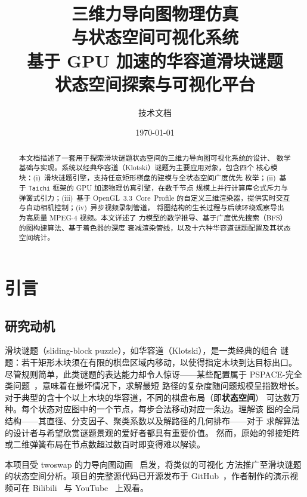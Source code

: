 \documentclass[11pt,a4paper]{report}
\title{\vspace{-2cm}
       \textbf{三维力导向图物理仿真 \\[0.3em]
              与状态空间可视化系统} \\[0.6em]
       \large 基于 GPU 加速的华容道滑块谜题 \\[0.2em]
       状态空间探索与可视化平台}
\author{技术文档}
\date{\today}
\begin{document}
\maketitle
\begin{abstract}
本文档描述了一套用于探索滑块谜题状态空间的三维力导向图可视化系统的设计、
数学基础与实现。系统以经典华容道（Klotski）谜题为主要应用对象，包含四个
核心模块：(i)~滑块谜题引擎，支持任意矩形棋盘的建模与全状态空间广度优先
枚举；(ii)~基于 \texttt{Taichi} 框架的 GPU 加速物理仿真引擎，在数千节点
规模上并行计算库仑式斥力与弹簧式引力；(iii)~基于 OpenGL~3.3~Core~Profile
的自定义三维渲染器，提供实时交互与自动相机控制；(iv)~异步视频录制管道，
将图结构的生长过程与后续环绕观察导出为高质量 MPEG-4 视频。本文详述了
力模型的数学推导、基于广度优先搜索（BFS）的图构建算法、基于着色器的深度
衰减渲染管线，以及十六种华容道谜题配置及其状态空间统计。
\end{abstract}
\tableofcontents
\listoffigures
\listoftables
\chapter{引言}
\label{ch:introduction}
\section{研究动机}
\label{sec:motivation}
滑块谜题（sliding-block puzzle），如华容道（Klotski），是一类经典的组合
谜题：若干矩形木块须在有限的棋盘区域内移动，以使得指定木块到达目标出口。
尽管规则简单，此类谜题的表达能力却令人惊讶——某些配置属于
PSPACE-完全类问题~\cite{hearn2006slides}，意味着在最坏情况下，求解最短
路径的复杂度随问题规模呈指数增长。
对于典型的含十个以上木块的华容道，不同的棋盘布局（即\textbf{状态空间}）
可达数万种。每个状态对应图中的一个节点，每步合法移动对应一条边。理解该
图的全局结构——其直径、分支因子、聚类系数以及解路径的几何排布——对于
求解算法的设计者与希望欣赏谜题景观的爱好者都具有重要价值。
然而，原始的邻接矩阵或二维弹簧布局在节点数超过数百时即变得难以解读。

本项目受 twoswap 的力导向图动画~\cite{twoswap2024} 启发，将类似的可视化
方法推广至滑块谜题的状态空间分析。项目的完整源代码已开源发布于
GitHub~\cite{klotski-github}，作者制作的演示视频可在
Bilibili~\cite{klotski-bilibili} 与 YouTube~\cite{klotski-youtube}
上观看。
\end{document}
